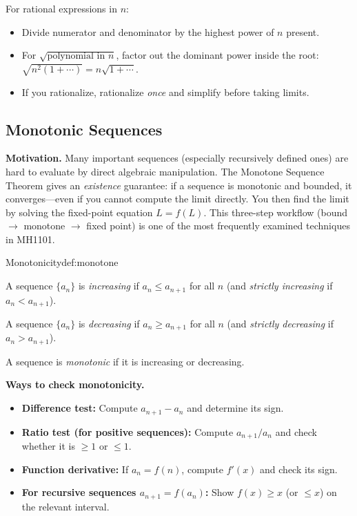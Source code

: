 \begin{examtip}

For rational expressions in $n$:

\begin{itemize}

\item Divide numerator and denominator by the highest power of $n$ present.

\item For $\sqrt{\text{polynomial in }n}$, factor out the dominant power inside the root: $\sqrt{n^2(1+\cdots)}=n\sqrt{1+\cdots}$.

\item If you rationalize, rationalize \emph{once} and simplify before taking limits.

\end{itemize}

\end{examtip}


\subsection{Monotonic Sequences}

\textbf{Motivation.}
Many important sequences (especially recursively defined ones) are hard to evaluate by direct algebraic manipulation.
The Monotone Sequence Theorem gives an \emph{existence} guarantee: if a sequence is monotonic and bounded, it converges---even if you cannot compute the limit directly.
You then find the limit by solving the fixed-point equation $L=f(L)$.
This three-step workflow (bound $\to$ monotone $\to$ fixed point) is one of the most frequently examined techniques in MH1101.

\begin{definition}{Monotonicity}{def:monotone}

A sequence $\{a_n\}$ is \emph{increasing} if $a_n\le a_{n+1}$ for all $n$ (and \emph{strictly increasing} if $a_n<a_{n+1}$).

A sequence $\{a_n\}$ is \emph{decreasing} if $a_n\ge a_{n+1}$ for all $n$ (and \emph{strictly decreasing} if $a_n>a_{n+1}$).

A sequence is \emph{monotonic} if it is increasing or decreasing.

\end{definition}

\noindent
\textbf{Ways to check monotonicity.}
\begin{itemize}[leftmargin=*]
\item \textbf{Difference test:} Compute $a_{n+1}-a_n$ and determine its sign.
\item \textbf{Ratio test (for positive sequences):} Compute $a_{n+1}/a_n$ and check whether it is $\ge 1$ or $\le 1$.
\item \textbf{Function derivative:} If $a_n=f(n)$, compute $f'(x)$ and check its sign.
\item \textbf{For recursive sequences $a_{n+1}=f(a_n)$:} Show $f(x)\ge x$ (or $\le x$) on the relevant interval.
\end{itemize}

